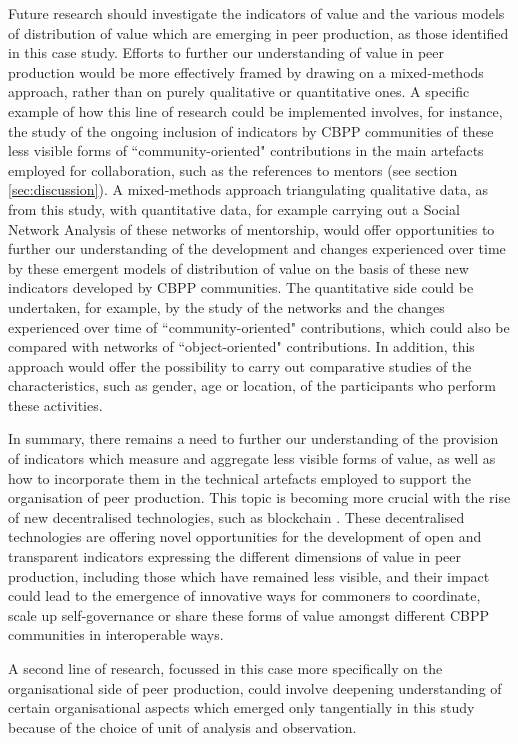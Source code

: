 Future research should investigate the indicators of value and the various models of distribution of value which are emerging in peer production, as those identified in this case study. Efforts to further our understanding of value in peer production would be more effectively framed by drawing on a mixed-methods approach, rather than on purely qualitative or quantitative ones. A specific example of how this line of research could be implemented involves, for instance, the study of the ongoing inclusion of indicators by CBPP communities of these less visible forms of ``community-oriented" contributions in the main artefacts employed for collaboration, such as the references to mentors (see section \ref{sec:discussion}). A mixed-methods approach triangulating qualitative data, as from this study, with quantitative data, for example carrying out a Social Network Analysis of these networks of mentorship, would offer opportunities to further our understanding of the development and changes experienced over time by these emergent models of distribution of value on the basis of these new indicators developed by CBPP communities. The quantitative side could be undertaken, for example, by the study of the networks and the changes experienced over time of ``community-oriented" contributions, which could also be compared with networks of ``object-oriented" contributions. In addition, this approach would offer the possibility to carry out comparative studies of the characteristics, such as gender, age or location, of the participants who perform these activities.

In summary, there remains a need to further our understanding of the provision of indicators which measure and aggregate less visible forms of value, as well as how to incorporate them in the technical artefacts employed to support the organisation of peer production. This topic is becoming more crucial with the rise of new decentralised technologies, such as blockchain \parencite{nakamoto2008bitcoin}. These decentralised technologies are offering novel opportunities for the development of open and transparent indicators expressing the different dimensions of value in peer production, including those which have remained less visible, and their impact could lead to the emergence of innovative ways for commoners to coordinate, scale up self-governance or share these forms of value amongst different CBPP communities in interoperable ways.

A second line of research, focussed in this case more specifically on the organisational side of peer production, could involve deepening understanding of certain organisational aspects which emerged only tangentially in this study because of the choice of unit of analysis and observation.

